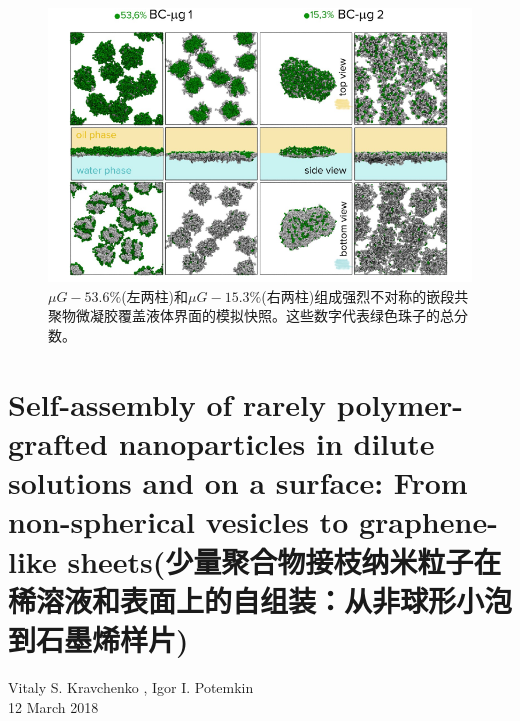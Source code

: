 \documentclass[12pt,a4paper]{article}
\numberwithin{equation}{section}
\begin{document}
\begin{figure}[H]
\centering
\includegraphics[scale=0.4]{./figures/22.png}
\caption{$μG-53.6\%$(左两柱)和$μG-15.3\%$(右两柱)组成强烈不对称的嵌段共聚物微凝胶覆盖液体界面的模拟快照。这些数字代表绿色珠子的总分数。}
\end{figure}		

	
\section{Self-assembly of rarely polymer-grafted nanoparticles in dilute
solutions and on a surface: From non-spherical vesicles to graphene-
like sheets(少量聚合物接枝纳米粒子在稀溶液和表面上的自组装：从非球形小泡到石墨烯样片)}
\begin{center}
Vitaly S. Kravchenko , Igor I. Potemkin\\
12 March 2018
\end{center}
\end{document}
